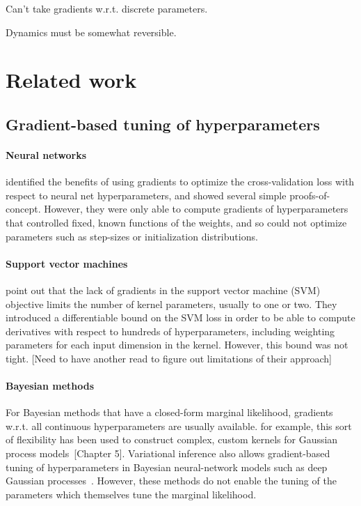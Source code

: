 \documentclass{article}
\begin{document}
Can't take gradients w.r.t. discrete parameters.

Dynamics must be somewhat reversible.


\section{Related work}

\subsection{Gradient-based tuning of hyperparameters}

\paragraph{Neural networks}
\citet{bengio2000gradient, larsen1998adaptive} identified the benefits of using gradients to optimize the cross-validation loss with respect to neural net hyperparameters, and showed several simple proofs-of-concept.
However, they were only able to compute gradients of hyperparameters that controlled fixed, known functions of the weights, and so could not optimize parameters such as step-sizes or initialization distributions.

\paragraph{Support vector machines}
\citet{chapelle2002choosing} point out that the lack of gradients in the support vector machine (SVM) objective limits the number of kernel parameters, usually to one or two.
They introduced a differentiable bound on the SVM loss in order to be able to compute derivatives with respect to hundreds of hyperparameters, including weighting parameters for each input dimension in the kernel.
However, this bound was not tight. [Need to have another read to figure out limitations of their approach]

\paragraph{Bayesian methods}
For Bayesian methods that have a closed-form marginal likelihood, gradients w.r.t. all continuous hyperparameters are usually available.
for example, this sort of flexibility has been used to construct complex, custom kernels for Gaussian process models~\cite{rasmussen38gaussian}[Chapter 5].
Variational inference also allows gradient-based tuning of hyperparameters in Bayesian neural-network models such as deep Gaussian processes~\citep{deepGPVar14}.
However, these methods do not enable the tuning of the parameters which themselves tune the marginal likelihood.
\end{document}
